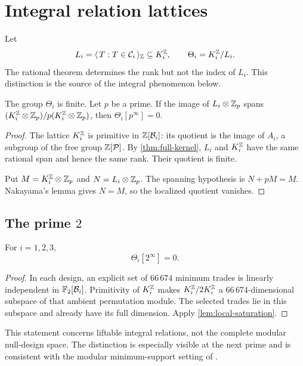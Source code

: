 \section{Integral relation lattices}
\label{sec:integral}

Let
\[
 L_i=\langle\,T:T\in\mathcal C_i\,\rangle_{\mathbb Z}
 \subseteq K_i^{\mathbb Z},
 \qquad
 \Theta_i=K_i^{\mathbb Z}/L_i.
\]
The rational theorem determines the rank but not the index of \(L_i\).
This distinction is the source of the integral phenomenon below.

\begin{lemma}
\label{lem:local-saturation}
The group \(\Theta_i\) is finite.  Let \(p\) be a prime.  If the image of
\(L_i\otimes\mathbb Z_p\) spans
\((K_i^{\mathbb Z}\otimes\mathbb Z_p)/p(K_i^{\mathbb Z}\otimes\mathbb Z_p)\), then
\(\Theta_i[p^\infty]=0\).
\end{lemma}

\begin{proof}
The lattice \(K_i^{\mathbb Z}\) is primitive in \(\mathbb Z[\mathcal B_i]\): its quotient
is the image of \(A_i\), a subgroup of the free group \(\mathbb Z[\mathcal P]\).
By \cref{thm:full-kernel}, \(L_i\) and \(K_i^{\mathbb Z}\) have the same
rational span and hence the same rank.  Their quotient is finite.

Put \(M=K_i^{\mathbb Z}\otimes\mathbb Z_p\) and
\(N=L_i\otimes\mathbb Z_p\).  The spanning hypothesis is \(N+pM=M\).
Nakayama's lemma gives \(N=M\), so the localized quotient vanishes.
\end{proof}

\subsection{The prime \(2\)}

\begin{proposition}
\label{prop:p2}
For \(i=1,2,3\),
\[
  \Theta_i[2^\infty]=0.
\]
\end{proposition}

\begin{proof}
In each design, an explicit set of \(66\,674\) minimum trades is linearly
independent in \(\mathbb F_2[\mathcal B_i]\).  Primitivity of \(K_i^{\mathbb Z}\) makes
\(K_i^{\mathbb Z}/2K_i^{\mathbb Z}\) a \(66\,674\)-dimensional subspace of that
ambient permutation module.  The selected trades lie in this subspace and
already have its full dimension.  Apply \cref{lem:local-saturation}.
\end{proof}

This statement concerns liftable integral relations, not the complete
modular null-design space.  The distinction is especially visible at the
next prime and is consistent with the modular minimum-support setting of
\cite{Krotov2020}.

